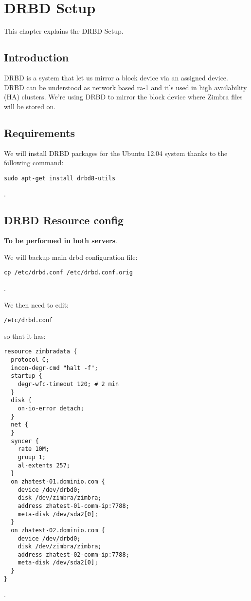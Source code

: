 

\chapter{DRBD Setup}
This chapter explains the DRBD Setup.

\section {Introduction}
DRBD is a system that let us mirror a block device via an assigned device. DRBD can be understood as network based ra-1 and it's used in high availability (HA) clusters.
We're using DRBD to mirror the block device where Zimbra files will be stored on.

\section {Requirements}
We will install DRBD packages for the Ubuntu 12.04 system thanks to the following command:
\begin{verbatim}
sudo apt-get install drbd8-utils
\end{verbatim}
.



\section {DRBD Resource config}
\textbf{To be performed in both servers}.

We will backup main drbd configuration file:
\begin{verbatim}
cp /etc/drbd.conf /etc/drbd.conf.orig
\end{verbatim}
.

We then need to edit:
\begin{verbatim}
/etc/drbd.conf
\end{verbatim}
so that it has:
\begin{verbatim}
resource zimbradata {
  protocol C;
  incon-degr-cmd "halt -f";
  startup {
    degr-wfc-timeout 120; # 2 min
  }
  disk {
    on-io-error detach;
  }
  net {
  }
  syncer {
    rate 10M;
    group 1;
    al-extents 257;
  }
  on zhatest-01.dominio.com {
    device /dev/drbd0;
    disk /dev/zimbra/zimbra;
    address zhatest-01-comm-ip:7788;
    meta-disk /dev/sda2[0];
  }
  on zhatest-02.dominio.com {
    device /dev/drbd0;
    disk /dev/zimbra/zimbra;
    address zhatest-02-comm-ip:7788;
    meta-disk /dev/sda2[0];
  }
}
\end{verbatim}
.


